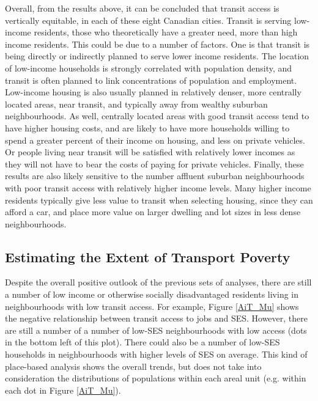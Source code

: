\documentclass[11 pt, letterpaper]{article}
\begin{document}
{Overall, from the results above, it can be concluded that transit access is vertically equitable, in each of these eight Canadian cities. Transit is serving low-income residents, those who theoretically have a greater need, more than high income residents. This could be due to a number of factors. One is that transit is being directly or indirectly planned to serve lower income residents. The location of low-income households is strongly correlated with population density, and transit is often planned to link concentrations of population and employment. Low-income housing is also usually planned in relatively denser, more centrally located areas, near transit, and typically away from wealthy suburban neighbourhoods. As well, centrally located areas with good transit access tend to have higher housing costs, and are likely to have more households willing to spend a greater percent of their income on housing, and less on private vehicles. Or people living near transit will be satisfied with relatively lower incomes as they will not have to bear the costs of paying for private vehicles. Finally, these results are also likely sensitive to the number affluent suburban neighbourhoods with poor transit access with relatively higher income levels. Many higher income residents typically give less value to transit when selecting housing, since they can afford a car, and place more value on larger dwelling and lot sizes in less dense neighbourhoods.




\subsection{Estimating the Extent of Transport Poverty}

Despite the overall positive outlook of the previous sets of analyses, there are still a number of low income or otherwise socially disadvantaged residents living in neighbourhoods with low transit access. For example, Figure \ref{AiT_Mu} shows the negative relationship between transit access to jobs and SES. However, there are still a number of a number of low-SES neighbourhoods with low access (dots in the bottom left of this plot). There could also be a number of low-SES households in neighbourhoods with higher levels of SES on average. This kind of place-based analysis shows the overall trends, but does not take into consideration the distributions of populations within each areal unit (e.g. within each dot in Figure \ref{AiT_Mu}).


}
\end{document}
